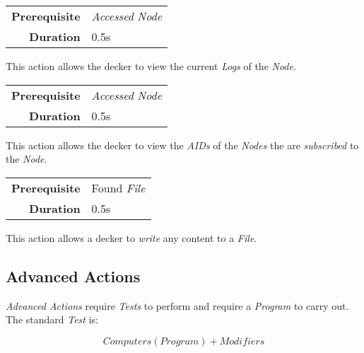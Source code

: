 \label{par:view logs}


\begin{tabular}{rl}
    \textbf{Prerequisite} & \emph{Accessed} \emph{Node} \\
    \textbf{Duration}     & 0.5s                        \\
\end{tabular}

\hfill

This action allows the decker to view the current \emph{Logs} of the
\emph{Node}.

\label{par:view subscriptions}


\begin{tabular}{rl}
    \textbf{Prerequisite} & \emph{Accessed} \emph{Node} \\
    \textbf{Duration}     & 0.5s                        \\
\end{tabular}

\hfill

This action allows the decker to view the \emph{AIDs} of the \emph{Nodes} the are
\emph{subscribed} to the \emph{Node}.

\label{par:write file}


\begin{tabular}{rl}
    \textbf{Prerequisite} & Found \emph{File} \\
    \textbf{Duration}     & 0.5s              \\
\end{tabular}

\hfill

This action allows a decker to \emph{write} any content to a \emph{File}.

\subsection{Advanced Actions}

\emph{Advanced Actions} require \emph{Tests} to perform and require a \emph{Program}
to carry out. The standard \emph{Test} is:

\begin{equation*}
    \textit{Computers}(\textit{Program}) + \textit{Modifiers}
\end{equation*}

\label{par:analyze}


